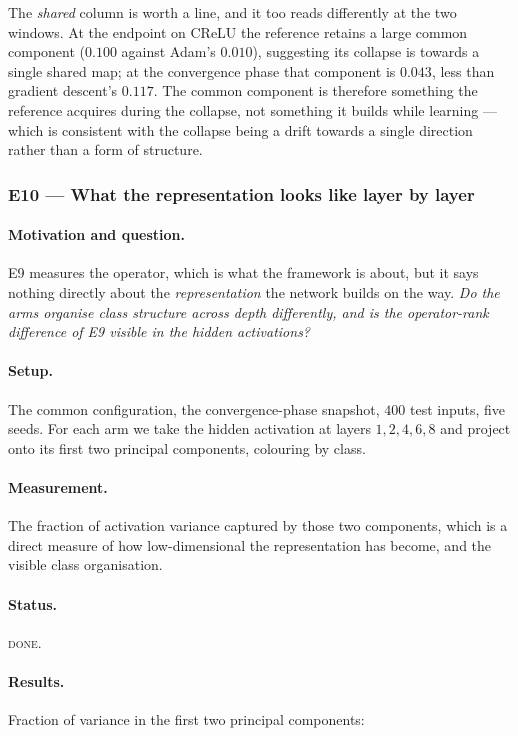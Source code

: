 \documentclass{article} %
\theoremstyle{plain}
\theoremstyle{definition}
\theoremstyle{remark}
\begin{document}
The \emph{shared} column is worth a line, and it too reads differently at the two windows. At the
endpoint on CReLU the reference retains a large common component ($0.100$ against Adam's $0.010$),
suggesting its collapse is towards a single shared map; at the convergence phase that component is
$0.043$, less than gradient descent's $0.117$. The common component is therefore something the
reference acquires during the collapse, not something it builds while learning --- which is
consistent with the collapse being a drift towards a single direction rather than a form of
structure.

\subsubsection{E10 --- What the representation looks like layer by layer}
\label{sec:e10}

\paragraph{Motivation and question.}
E9 measures the operator, which is what the framework is about, but it says nothing directly about
the \emph{representation} the network builds on the way. \emph{Do the arms organise class structure
across depth differently, and is the operator-rank difference of E9 visible in the hidden
activations?}

\paragraph{Setup.} The common configuration, the convergence-phase snapshot, $400$ test inputs,
five seeds. For each arm we take the hidden activation at layers $1, 2, 4, 6, 8$ and project onto
its first two principal components, colouring by class.

\paragraph{Measurement.} The fraction of activation variance captured by those two components,
which is a direct measure of how low-dimensional the representation has become, and the visible
class organisation.

\paragraph{Status.} \textsc{done}.

\paragraph{Results.}
Fraction of variance in the first two principal components:
\end{document}
